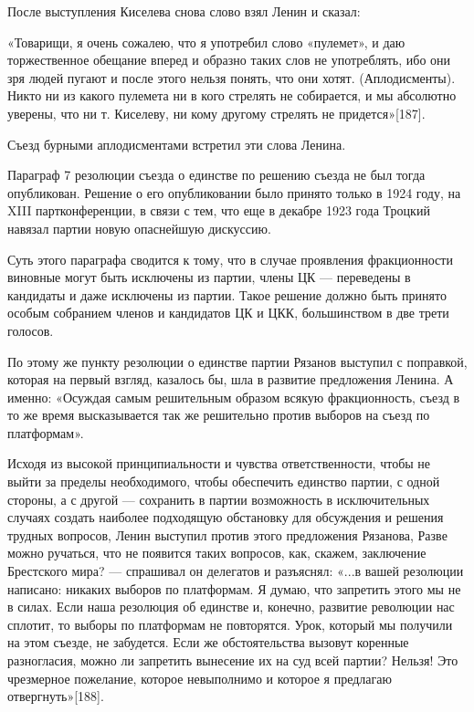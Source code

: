 \documentclass[12pt, a4paper, openany]{book}
\begin{document}
После выступления Киселева снова слово взял Ленин и сказал:

«Товарищи, я очень сожалею, что я употребил слово «пулемет», и даю торжественное обещание вперед и образно таких слов не употреблять, ибо они зря людей пугают и после этого нельзя понять, что они хотят. (Аплодисменты). Никто ни из какого пулемета ни в кого стрелять не собирается, и мы абсолютно уверены, что ни т. Киселеву, ни кому другому стрелять не придется»[187].

Съезд бурными аплодисментами встретил эти слова Ленина.

Параграф 7 резолюции съезда о единстве по решению съезда не был тогда опубликован. Решение о его опубликовании было принято только в 1924 году, на XIII партконференции, в связи с тем, что еще в декабре 1923 года Троцкий навязал партии новую опаснейшую дискуссию.

Суть этого параграфа сводится к тому, что в случае проявления фракционности виновные могут быть исключены из партии, члены ЦК — переведены в кандидаты и даже исключены из партии. Такое решение должно быть принято особым собранием членов и кандидатов ЦК и ЦКК, большинством в две трети голосов.

По этому же пункту резолюции о единстве партии Рязанов выступил с поправкой, которая на первый взгляд, казалось бы, шла в развитие предложения Ленина. А именно: «Осуждая самым решительным образом всякую фракционность, съезд в то же время высказывается так же решительно против выборов на съезд по платформам».

Исходя из высокой принципиальности и чувства ответственности, чтобы не выйти за пределы необходимого, чтобы обеспечить единство партии, с одной стороны, а с другой — сохранить в партии возможность в исключительных случаях создать наиболее подходящую обстановку для обсуждения и решения трудных вопросов, Ленин выступил против этого предложения Рязанова, Разве можно ручаться, что не появится таких вопросов, как, скажем, заключение Брестского мира? — спрашивал он делегатов и разъяснял: «...в вашей резолюции написано: никаких выборов по платформам. Я думаю, что запретить этого мы не в силах. Если наша резолюция об единстве и, конечно, развитие революции нас сплотит, то выборы по платформам не повторятся. Урок, который мы получили на этом съезде, не забудется. Если же обстоятельства вызовут коренные разногласия, можно ли запретить вынесение их на суд всей партии? Нельзя! Это чрезмерное пожелание, которое невыполнимо и которое я предлагаю отвергнуть»[188].
\end{document}
